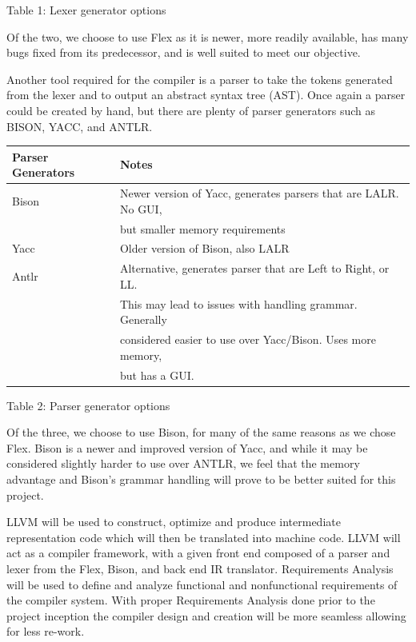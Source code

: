 \documentclass[11pt]{article}
\begin{document}
\begin{center}
Table 1: Lexer generator options
\end{center}

Of the two, we choose to use Flex as it is newer, more readily available, has many bugs fixed from its predecessor, and is well suited to meet our objective. 

Another tool required for the compiler is a parser to take the tokens generated from the lexer and to output an abstract syntax tree (AST). Once again a parser could be created by hand, but there are plenty of parser generators such as BISON, YACC, and ANTLR.

\begin{center}
\begin{tabular}{ |l | l|  }
 \hline
 Parser Generators & Notes \\
 \hline 
 Bison & Newer version of Yacc, generates parsers that are LALR. No GUI,\\
       & but smaller memory requirements \\
 \hline 
 Yacc & Older version of Bison, also LALR \\
 \hline
 Antlr & Alternative, generates parser that are Left to Right, or  LL.\\
       & This may lead to issues with handling grammar. Generally \\
       & considered easier to use over Yacc/Bison. Uses more memory,\\
       & but has a GUI. \\
 \hline
\end{tabular}
\end{center}

\begin{center}
Table 2: Parser generator options
\end{center}

Of the three, we choose to use Bison, for many of the same reasons as we chose Flex. Bison is a newer and improved version of Yacc, and while it may be considered slightly harder to use over ANTLR, we feel that the memory advantage and Bison’s grammar handling will prove to be better suited for this project.

 LLVM will be used to construct, optimize and produce intermediate representation code which will then be translated into machine code. LLVM will act as a compiler framework, with a given front end composed of a parser and lexer from the Flex, Bison, and back end IR translator. Requirements Analysis will be used to define and analyze functional and nonfunctional requirements of the compiler system. With proper Requirements Analysis done prior to the project inception the compiler design and creation will be more seamless allowing for less re-work. 
\end{document}
